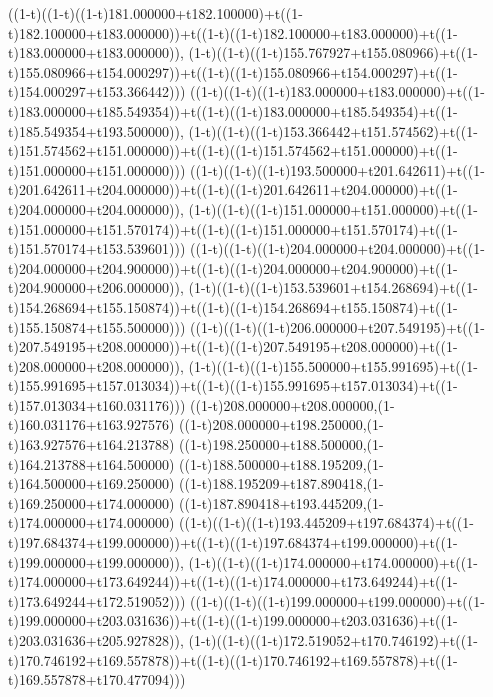 ((1-t)((1-t)((1-t)181.000000+t182.100000)+t((1-t)182.100000+t183.000000))+t((1-t)((1-t)182.100000+t183.000000)+t((1-t)183.000000+t183.000000)),                                     (1-t)((1-t)((1-t)155.767927+t155.080966)+t((1-t)155.080966+t154.000297))+t((1-t)((1-t)155.080966+t154.000297)+t((1-t)154.000297+t153.366442)))
((1-t)((1-t)((1-t)183.000000+t183.000000)+t((1-t)183.000000+t185.549354))+t((1-t)((1-t)183.000000+t185.549354)+t((1-t)185.549354+t193.500000)),                                     (1-t)((1-t)((1-t)153.366442+t151.574562)+t((1-t)151.574562+t151.000000))+t((1-t)((1-t)151.574562+t151.000000)+t((1-t)151.000000+t151.000000)))
((1-t)((1-t)((1-t)193.500000+t201.642611)+t((1-t)201.642611+t204.000000))+t((1-t)((1-t)201.642611+t204.000000)+t((1-t)204.000000+t204.000000)),                                     (1-t)((1-t)((1-t)151.000000+t151.000000)+t((1-t)151.000000+t151.570174))+t((1-t)((1-t)151.000000+t151.570174)+t((1-t)151.570174+t153.539601)))
((1-t)((1-t)((1-t)204.000000+t204.000000)+t((1-t)204.000000+t204.900000))+t((1-t)((1-t)204.000000+t204.900000)+t((1-t)204.900000+t206.000000)),                                     (1-t)((1-t)((1-t)153.539601+t154.268694)+t((1-t)154.268694+t155.150874))+t((1-t)((1-t)154.268694+t155.150874)+t((1-t)155.150874+t155.500000)))
((1-t)((1-t)((1-t)206.000000+t207.549195)+t((1-t)207.549195+t208.000000))+t((1-t)((1-t)207.549195+t208.000000)+t((1-t)208.000000+t208.000000)),                                     (1-t)((1-t)((1-t)155.500000+t155.991695)+t((1-t)155.991695+t157.013034))+t((1-t)((1-t)155.991695+t157.013034)+t((1-t)157.013034+t160.031176)))
((1-t)208.000000+t208.000000,(1-t)160.031176+t163.927576)
((1-t)208.000000+t198.250000,(1-t)163.927576+t164.213788)
((1-t)198.250000+t188.500000,(1-t)164.213788+t164.500000)
((1-t)188.500000+t188.195209,(1-t)164.500000+t169.250000)
((1-t)188.195209+t187.890418,(1-t)169.250000+t174.000000)
((1-t)187.890418+t193.445209,(1-t)174.000000+t174.000000)
((1-t)((1-t)((1-t)193.445209+t197.684374)+t((1-t)197.684374+t199.000000))+t((1-t)((1-t)197.684374+t199.000000)+t((1-t)199.000000+t199.000000)),                                     (1-t)((1-t)((1-t)174.000000+t174.000000)+t((1-t)174.000000+t173.649244))+t((1-t)((1-t)174.000000+t173.649244)+t((1-t)173.649244+t172.519052)))
((1-t)((1-t)((1-t)199.000000+t199.000000)+t((1-t)199.000000+t203.031636))+t((1-t)((1-t)199.000000+t203.031636)+t((1-t)203.031636+t205.927828)),                                     (1-t)((1-t)((1-t)172.519052+t170.746192)+t((1-t)170.746192+t169.557878))+t((1-t)((1-t)170.746192+t169.557878)+t((1-t)169.557878+t170.477094)))
